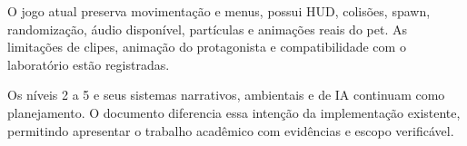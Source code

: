 \documentclass[12pt,a4paper]{article}
\begin{document}
O jogo atual preserva movimentação e menus, possui HUD, colisões,
spawn, randomização, áudio disponível, partículas e animações reais
do pet. As limitações de clipes, animação do protagonista e
compatibilidade com o laboratório estão registradas.

Os níveis 2 a 5 e seus sistemas narrativos, ambientais e de IA
continuam como planejamento. O documento diferencia essa intenção
da implementação existente, permitindo apresentar o trabalho
acadêmico com evidências e escopo verificável.
\end{document}
